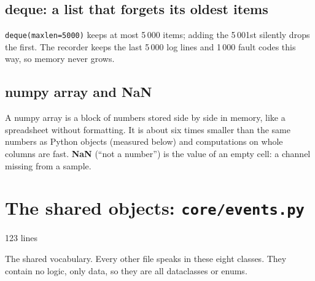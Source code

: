 \documentclass[10pt]{article}
\newcommand{\brkus}{\textunderscore\allowbreak}
\newcommand{\f}[1]{\texttt{\let\_\brkus #1}}
\newcommand{\filehead}[2]{\par\smallskip\noindent{\bfseries\ttfamily #1}\hfill{\small\color{ink2}#2 lines}\par\nobreak}
\begin{document}
\subsection{deque: a list that forgets its oldest items}
\f{deque(maxlen=5000)} keeps at most 5\,000 items; adding the 5\,001st silently drops the first.
The recorder keeps the last 5\,000 log lines and 1\,000 fault codes this way, so memory never
grows.

\subsection{numpy array and NaN}
A numpy array is a block of numbers stored side by side in memory, like a spreadsheet without
formatting. It is about six times smaller than the same numbers as Python objects (measured
below) and computations on whole columns are fast. \textbf{NaN} (``not a number'') is the value
of an empty cell: a channel missing from a sample.

\section{The shared objects: \f{core/events.py}}\label{sec:events}
\filehead{events.py}{123}
The shared vocabulary. Every other file speaks in these eight classes. They contain no logic,
only data, so they are all dataclasses or enums.
\end{document}
